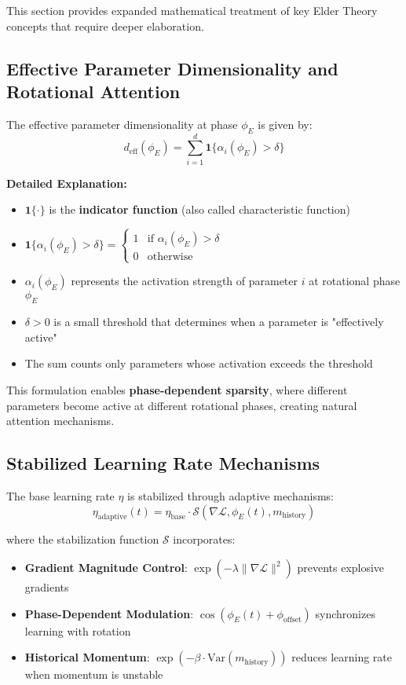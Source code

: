 This section provides expanded mathematical treatment of key Elder Theory concepts that require deeper elaboration.

\subsection{Effective Parameter Dimensionality and Rotational Attention}

The effective parameter dimensionality at phase $\phi_E$ is given by:
\begin{equation}
d_{\text{eff}}(\phi_E) = \sum_{i=1}^{d} \mathbf{1}\{\alpha_i(\phi_E) > \delta\}
\end{equation}

\textbf{Detailed Explanation:}
\begin{itemize}
    \item $\mathbf{1}\{\cdot\}$ is the \textbf{indicator function} (also called characteristic function)
    \item $\mathbf{1}\{\alpha_i(\phi_E) > \delta\} = \begin{cases} 1 & \text{if } \alpha_i(\phi_E) > \delta \\ 0 & \text{otherwise} \end{cases}$
    \item $\alpha_i(\phi_E)$ represents the activation strength of parameter $i$ at rotational phase $\phi_E$
    \item $\delta > 0$ is a small threshold that determines when a parameter is "effectively active"
    \item The sum counts only parameters whose activation exceeds the threshold
\end{itemize}

This formulation enables \textbf{phase-dependent sparsity}, where different parameters become active at different rotational phases, creating natural attention mechanisms.

\subsection{Stabilized Learning Rate Mechanisms}

The base learning rate $\eta$ is stabilized through adaptive mechanisms:
\begin{equation}
\eta_{\text{adaptive}}(t) = \eta_{\text{base}} \cdot \mathcal{S}(\nabla \mathcal{L}, \phi_E(t), m_{\text{history}})
\end{equation}

where the stabilization function $\mathcal{S}$ incorporates:
\begin{itemize}
    \item \textbf{Gradient Magnitude Control}: $\exp(-\lambda \|\nabla \mathcal{L}\|^2)$ prevents explosive gradients
    \item \textbf{Phase-Dependent Modulation}: $\cos(\phi_E(t) + \phi_{\text{offset}})$ synchronizes learning with rotation
    \item \textbf{Historical Momentum}: $\exp(-\beta \cdot \text{Var}(m_{\text{history}}))$ reduces learning rate when momentum is unstable
\end{itemize}


